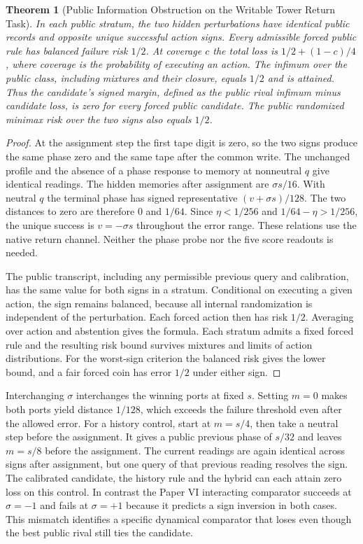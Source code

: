 \documentclass[11pt,a4paper]{article}
\newtheorem{theorem}{Theorem}[section]
\theoremstyle{definition}
\begin{document}
\begin{theorem}[Public Information Obstruction on the Writable Tower Return Task]\label{thm:writable-tower-public-return-tie}
In each public stratum, the two hidden perturbations have identical public records and opposite unique successful action signs. Every admissible forced public rule has balanced failure risk $1/2$. At coverage $c$ the total loss is $1/2+(1-c)/4$, where coverage is the probability of executing an action. The infimum over the public class, including mixtures and their closure, equals $1/2$ and is attained. Thus the candidate's signed margin, defined as the public rival infimum minus candidate loss, is zero for every forced public candidate. The public randomized minimax risk over the two signs also equals $1/2$.
\end{theorem}
\begin{proof}
At the assignment step the first tape digit is zero, so the two signs produce the same phase zero and the same tape after the common write. The unchanged profile and the absence of a phase response to memory at nonneutral $q$ give identical readings. The hidden memories after assignment are $\sigma s/16$. With neutral $q$ the terminal phase has signed representative $(v+\sigma s)/128$. The two distances to zero are therefore $0$ and $1/64$. Since $\eta<1/256$ and $1/64-\eta>1/256$, the unique success is $v=-\sigma s$ throughout the error range. These relations use the native return channel. Neither the phase probe nor the five score readouts is needed.

The public transcript, including any permissible previous query and calibration, has the same value for both signs in a stratum. Conditional on executing a given action, the sign remains balanced, because all internal randomization is independent of the perturbation. Each forced action then has risk $1/2$. Averaging over action and abstention gives the formula. Each stratum admits a fixed forced rule and the resulting risk bound survives mixtures and limits of action distributions. For the worst-sign criterion the balanced risk gives the lower bound, and a fair forced coin has error $1/2$ under either sign.
\end{proof}

Interchanging $\sigma$ interchanges the winning ports at fixed $s$. Setting $m=0$ makes both ports yield distance $1/128$, which exceeds the failure threshold even after the allowed error. For a history control, start at $m=s/4$, then take a neutral step before the assignment. It gives a public previous phase of $s/32$ and leaves $m=s/8$ before the assignment. The current readings are again identical across signs after assignment, but one query of that previous reading resolves the sign. The calibrated candidate, the history rule and the hybrid can each attain zero loss on this control. In contrast the Paper VI interacting comparator succeeds at $\sigma=-1$ and fails at $\sigma=+1$ because it predicts a sign inversion in both cases. This mismatch identifies a specific dynamical comparator that loses even though the best public rival still ties the candidate.
\end{document}
